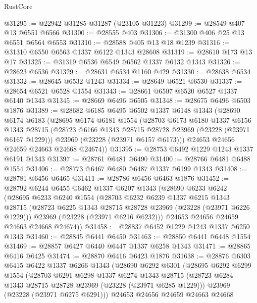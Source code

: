 \begin{lexlean}{RustCore}
\begin{coremodule}
@31295 := @22942 @31285 @31287 (@23105 @31223)
@31299 := @28549 @407 @13 @6551 @6566
@31300 := @28555 @403
@31306 := @31300 @406 @25 @13 @6551 @6564 @6553
@31310 := @28588 @405 @13 @18 @1239
@31316 := @31310 @6550 @6563 @1337 @6122 @1343 @28608
@31319 := @28610 @173 @13 @17
@31325 := @31319 @6536 @6549 @6562 @1337 @6132 @1343
@31326 := @28623 @6536
@31329 := @28631 @6534 @1160 @429
@31330 := @28638 @6534
@31332 := @28645 @6532 @1243
@31334 := @28649 @6521 @6530
@31337 := @28654 @6521 @6528 @1554
@31343 := @28661 @6507 @6520 @6527 @1337 @6140 @1343
@31345 := @28669 @6496 @6505
@31348 := @28675 @6496 @6503 @1876
@31389 := @28682
    @6185
    @6495
    @6502
    @1337
    @6148
    @1343
    (@28690
      @6174
      @6183
      (@28695
        @6174
        @6181
        @1554
        (@28703
          @6173
          @6180
          @1337
          @6156
          @1343
          @28715
          (@28723 @6166 @1343 @28715 @28728 @23969 (@23228 (@23971 @6167 @1229)))
          @23969
          (@23228 (@23971 @6157 @6173)))
        @24653
        @24656
        @24659
        @24663
        @24668
        @24674))
@31395 := @28753 @6492 @1229 @1243 @1337 @6191 @1343
@31397 := @28761 @6481 @6490
@31400 := @28766 @6481 @6488 @1554
@31406 := @28773 @6467 @6480 @6487 @1337 @6199 @1343
@31408 := @28781 @6456 @6465
@31411 := @28786 @6456 @6463 @1876
@31452 := @28792
    @6244
    @6455
    @6462
    @1337
    @6207
    @1343
    (@28690
      @6233
      @6242
      (@28695
        @6233
        @6240
        @1554
        (@28703
          @6232
          @6239
          @1337
          @6215
          @1343
          @28715
          (@28723 @6225 @1343 @28715 @28728 @23969 (@23228 (@23971 @6226 @1229)))
          @23969
          (@23228 (@23971 @6216 @6232)))
        @24653
        @24656
        @24659
        @24663
        @24668
        @24674))
@31458 := @28837 @6452 @1229 @1243 @1337 @6250 @1343
@31460 := @28845 @6441 @6450
@31463 := @28850 @6441 @6448 @1554
@31469 := @28857 @6427 @6440 @6447 @1337 @6258 @1343
@31471 := @28865 @6416 @6425
@31474 := @28870 @6416 @6423 @1876
@31638 := @28876
    @6303
    @6415
    @6422
    @1337
    @6266
    @1343
    (@28690
      @6292
      @6301
      (@28695
        @6292
        @6299
        @1554
        (@28703
          @6291
          @6298
          @1337
          @6274
          @1343
          @28715
          (@28723 @6284 @1343 @28715 @28728 @23969 (@23228 (@23971 @6285 @1229)))
          @23969
          (@23228 (@23971 @6275 @6291)))
        @24653
        @24656
        @24659
        @24663
        @24668

\end{coremodule}
\end{lexlean}

